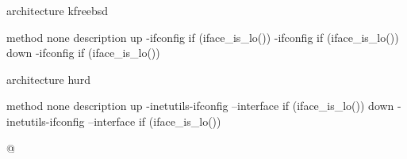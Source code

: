 \documentclass{article}
\begin{document}
architecture kfreebsd

method none
  description
  up
    -ifconfig %
	if (iface_is_lo())
    -ifconfig %
	if (iface_is_lo())
  down
    -ifconfig %
	if (iface_is_lo())

architecture hurd

method none
  description
  up
    -inetutils-ifconfig --interface %
	if (iface_is_lo())
  down
    -inetutils-ifconfig --interface %
	if (iface_is_lo())

@ 

\begin{flushleft}


\end{flushleft}
\end{document}
